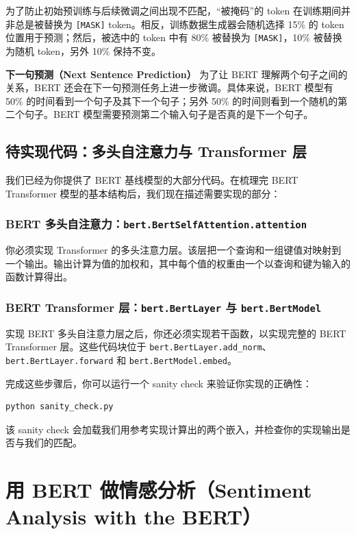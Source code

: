 \documentclass[11pt]{article}
\begin{document}
为了防止初始预训练与后续微调之间出现不匹配，``被掩码''的 token 在训练期间并非总是被替换为 \texttt{[MASK]} token。相反，训练数据生成器会随机选择 15\% 的 token 位置用于预测；然后，被选中的 token 中有 80\% 被替换为 \texttt{[MASK]}，10\% 被替换为随机 token，另外 10\% 保持不变。

\textbf{下一句预测（Next Sentence Prediction）} 为了让 BERT 理解两个句子之间的关系，BERT 还会在下一句预测任务上进一步微调。具体来说，BERT 模型有 50\% 的时间看到一个句子及其下一个句子；另外 50\% 的时间则看到一个随机的第二个句子。BERT 模型需要预测第二个输入句子是否真的是下一个句子。

\subsection{待实现代码：多头自注意力与 Transformer 层}

我们已经为你提供了 BERT 基线模型的大部分代码。在梳理完 BERT Transformer 模型的基本结构后，我们现在描述需要实现的部分：

\subsubsection{BERT 多头自注意力：\texttt{bert.BertSelfAttention.attention}}

你必须实现 Transformer 的多头注意力层。该层把一个查询和一组键值对映射到一个输出。输出计算为值的加权和，其中每个值的权重由一个以查询和键为输入的函数计算得出。

\subsubsection{BERT Transformer 层：\texttt{bert.BertLayer} 与 \texttt{bert.BertModel}}

实现 BERT 多头自注意力层之后，你还必须实现若干函数，以实现完整的 BERT Transformer 层。这些代码块位于 \texttt{bert.BertLayer.add\_norm}、\texttt{bert.BertLayer.forward} 和 \texttt{bert.BertModel.embed}。

完成这些步骤后，你可以运行一个 sanity check 来验证你实现的正确性：

\begin{lstlisting}[numbers=none]
python sanity_check.py
\end{lstlisting}

该 sanity check 会加载我们用参考实现计算出的两个嵌入，并检查你的实现输出是否与我们的匹配。

\section{用 BERT 做情感分析（Sentiment Analysis with the BERT）}
\end{document}
